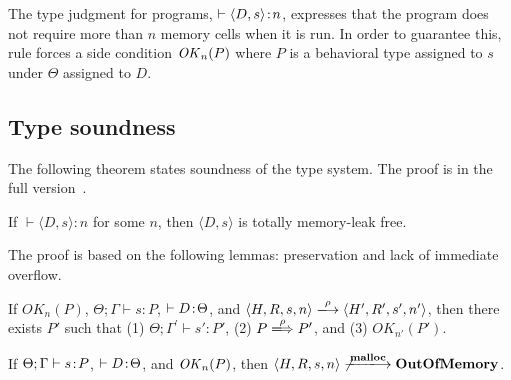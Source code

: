 The type judgment for programs, \(\vdash \langle D, s \rangle \!:\! n\),
expresses that the program does not require more than \(n\) memory
cells when it is run.  In order to guarantee this, rule 
forces a side condition \(\mathit{OK}_n(P)\) where \(P\) is a behavioral type
assigned to \(s\) under \(\Theta\) assigned to \(D\).

\subsection{Type soundness}


The following theorem states soundness of the type system.  The proof
is in the full version~\cite{fullversion}.

\begin{theorem}\label{thm1}
If $\vdash \langle D, s \rangle : n$ for some \(n\), then \(\langle D,
s \rangle\) is totally memory-leak free.
\end{theorem}


The proof is based on the following lemmas: preservation and lack of
immediate overflow.

\begin{lemma}[Preservation]
\label{lem:preservation}
If $OK_{n}(P)$, $\Theta; \Gamma \vdash s : P$, \(\vdash D \!:\!
\Theta\), and $\langle H,R,s,n \rangle \xlongrightarrow{\rho} \langle
H',R',s', n' \rangle$, then there exists $P'$ such that (1) $ \Theta;
\Gamma^{'} \vdash s' : P'$, (2) \(P \xLongrightarrow{\rho} P'\), and (3)
\(OK_{n'}(P')\).
\end{lemma}


\begin{lemma}
\label{lem:immediateSafety}
If $\Theta; \Gamma \vdash s \!:\! P$, \(\vdash D \!:\! \Theta\), and
\(\mathit{OK}_n(P)\), then $\langle H, R, s, n \rangle
\not\xlongrightarrow{\Malloc} \OVERFLOW$.
\end{lemma}
